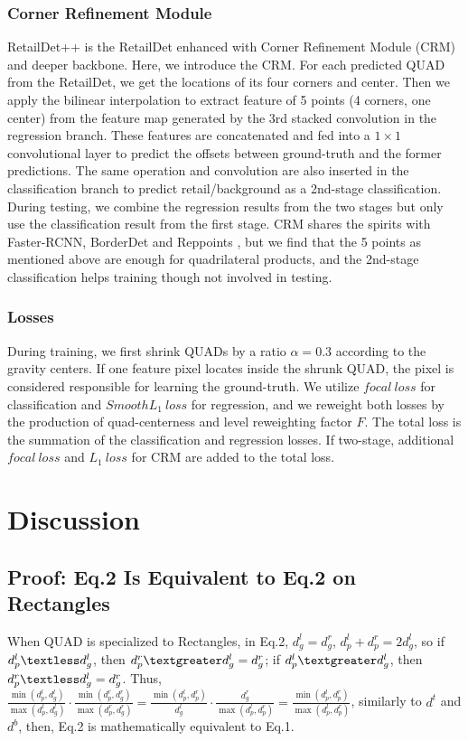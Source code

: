 \documentclass[runningheads]{llncs}
\begin{document}
\subsubsection{Corner Refinement Module}
RetailDet++ is the RetailDet enhanced with Corner Refinement Module (CRM) and deeper backbone. Here, we introduce the CRM. For each predicted QUAD from the RetailDet, we get the locations of its four corners and center. Then we apply the bilinear interpolation to extract feature of 5 points (4 corners, one center) from the feature map generated by the 3rd stacked convolution in the regression branch. These features are concatenated and fed into a $1\times1$ convolutional layer to predict the offsets between ground-truth and the former predictions. The same operation and convolution are also inserted in the classification branch to predict retail/background as a 2nd-stage classification. During testing, we combine the regression results from the two stages but only use the classification result from the first stage. CRM shares the spirits with Faster-RCNN\cite{ren2015faster}, BorderDet\cite{BorderDet} and Reppoints \cite{reppoints}, but we find that the 5 points as mentioned above are enough for quadrilateral products, and the 2nd-stage classification helps training though not involved in testing.

\subsubsection{Losses}
During training, we first shrink QUADs by a ratio $\alpha = 0.3$  according to the gravity centers. If one feature pixel locates inside the shrunk QUAD, the pixel is considered responsible for learning the ground-truth. 
We utilize $focal~ loss$ \cite{lin2017focal} for classification and $SmoothL_1~loss$ for regression, and we reweight both losses by the production of quad-centerness and level reweighting factor $F$. The total loss is the summation of the classification and regression losses. If two-stage, additional $focal~ loss$ and $L_1~loss$ for CRM are added to the total loss.


\section{Discussion}
\subsection{Proof: Eq.2 Is Equivalent to Eq.2 on Rectangles}
When QUAD is specialized to Rectangles, in Eq.2,  $d_g^l=d_g^r$, $d_{p}^l+d_{p}^r=2d_g^l$, so if $d_p^l \textless d_g^l$, then $d_p^r \textgreater d_g^l = d_g^r$; if $d_p^l \textgreater d_g^l$, then $d_p^r \textless d_g^l = d_g^r$. Thus, $\frac{\min(d_{p}^l,d_{g}^l)}{\max(d_{p}^l, d_{g}^l) } \cdot \frac{\min(d_{p}^r,d_{g}^r)}{\max(d_{p}^r, d_{g}^r) } = \frac{\min(d_{p}^l,d_{p}^r)}{d_{g}^l } \cdot \frac{d_{g}^r}{\max(d_{p}^l, d_{p}^r) } =  \frac{\min(d_{p}^l,d_{p}^r)}{\max(d_{p}^l, d_{p}^r) }$, similarly to $d^t$ and $d^b$,  then, Eq.2 is mathematically equivalent to Eq.1.
\end{document}
